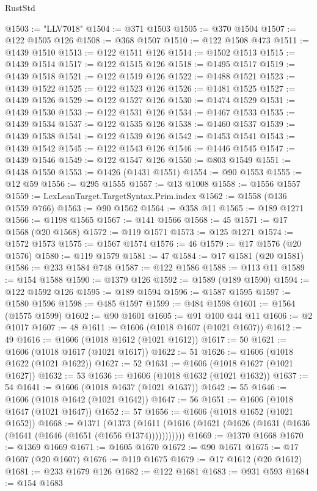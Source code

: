 \begin{lexlean}{RustStd}
\begin{coremodule}
{\begin{coremodule}
{{{{{{{{{{{{{{{{{{{{{{{{{{{{{{{{{{{{{{{{{{{{{{{{{{{{{{{{{{{{{{{{{{{{@1503 := "LLV7018"
@1504 := @371 @1503
@1505 := @370 @1504
@1507 := @122 @1505 @126
@1508 := @368 @1507
@1510 := @122 @1508 @473
@1511 := @1439 @1510
@1513 := @122 @1511 @126
@1514 := @1502 @1513
@1515 := @1439 @1514
@1517 := @122 @1515 @126
@1518 := @1495 @1517
@1519 := @1439 @1518
@1521 := @122 @1519 @126
@1522 := @1488 @1521
@1523 := @1439 @1522
@1525 := @122 @1523 @126
@1526 := @1481 @1525
@1527 := @1439 @1526
@1529 := @122 @1527 @126
@1530 := @1474 @1529
@1531 := @1439 @1530
@1533 := @122 @1531 @126
@1534 := @1467 @1533
@1535 := @1439 @1534
@1537 := @122 @1535 @126
@1538 := @1460 @1537
@1539 := @1439 @1538
@1541 := @122 @1539 @126
@1542 := @1453 @1541
@1543 := @1439 @1542
@1545 := @122 @1543 @126
@1546 := @1446 @1545
@1547 := @1439 @1546
@1549 := @122 @1547 @126
@1550 := @803 @1549
@1551 := @1438 @1550
@1553 := @1426 (@1431 @1551)
@1554 := @90 @1553
@1555 := @12 @59
@1556 := @295 @1555
@1557 := @13 @1008
@1558 := @1556 @1557
@1559 := LexLeanTarget.TargetSyntax.Prim.index
@1562 := @1558 (@136 @1559 @766)
@1563 := @90 @1562
@1564 := @358 @11
@1565 := @189 @1271
@1566 := @1198 @1565
@1567 := @141 @1566
@1568 := 45
@1571 := @17 @1568 (@20 @1568)
@1572 := @119 @1571
@1573 := @125 @1271
@1574 := @1572 @1573
@1575 := @1567 @1574
@1576 := 46
@1579 := @17 @1576 (@20 @1576)
@1580 := @119 @1579
@1581 := 47
@1584 := @17 @1581 (@20 @1581)
@1586 := @233 @1584 @748
@1587 := @122 @1586
@1588 := @113 @11
@1589 := @154 @1588
@1590 := @1379 @126
@1592 := @1589 (@189 @1590)
@1594 := @122 @1592 @126
@1595 := @189 @1594
@1596 := @1587 @1595
@1597 := @1580 @1596
@1598 := @485 @1597
@1599 := @484 @1598
@1601 := @1564 (@1575 @1599)
@1602 := @90 @1601
@1605 := @91 @100 @44 @11
@1606 := @2 @1017
@1607 := 48
@1611 := @1606 (@1018 @1607 (@1021 @1607))
@1612 := 49
@1616 := @1606 (@1018 @1612 (@1021 @1612))
@1617 := 50
@1621 := @1606 (@1018 @1617 (@1021 @1617))
@1622 := 51
@1626 := @1606 (@1018 @1622 (@1021 @1622))
@1627 := 52
@1631 := @1606 (@1018 @1627 (@1021 @1627))
@1632 := 53
@1636 := @1606 (@1018 @1632 (@1021 @1632))
@1637 := 54
@1641 := @1606 (@1018 @1637 (@1021 @1637))
@1642 := 55
@1646 := @1606 (@1018 @1642 (@1021 @1642))
@1647 := 56
@1651 := @1606 (@1018 @1647 (@1021 @1647))
@1652 := 57
@1656 := @1606 (@1018 @1652 (@1021 @1652))
@1668 := @1371
    (@1373 (@1611 (@1616 (@1621 (@1626 (@1631 (@1636 (@1641 (@1646 (@1651 (@1656 @1374)))))))))))
@1669 := @1370 @1668
@1670 := @1369 @1669
@1671 := @1605 @1670
@1672 := @90 @1671
@1675 := @17 @1607 (@20 @1607)
@1676 := @119 @1675
@1679 := @17 @1612 (@20 @1612)
@1681 := @233 @1679 @126
@1682 := @122 @1681
@1683 := @931 @593
@1684 := @154 @1683
}}}}}}}}}}}}}}}}}}}}}}}}}}}}}}}}}}}}}}}}}}}}}}}}}}}}}}}}}}}}}}}}}}}}
\end{coremodule}}
\end{coremodule}
\end{lexlean}
